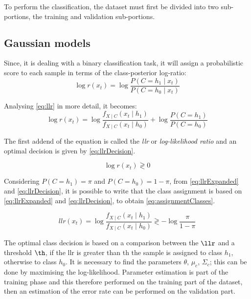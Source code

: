 
To perform the classification, the dataset must first be divided into two sub-portions, the training and validation sub-portions.

\subsection{Gaussian models}
\label{subsec:gaussianModels}
Since, it is dealing with a binary classification task, it will assign a probabilistic score to each sample in terms
of the class-posterior log-ratio:
\begin{equation}
    \log r(x_t) = \log \frac{P(C=h_1\mid x_t)}{P(C=h_0\mid x_t)}
    \label{eq:llr}
\end{equation}

Analysing \autoref{eq:llr} in more detail, it becomes:
\begin{equation}
    \log r(x_t) = \log \frac{f_{X\mid C}(x_t \mid h_1)}{f_{X\mid C}(x_t \mid h_0)} + \log \frac{P(C=h_1)}{P(C=h_0)}
    \label{eq:llrExpanded}
\end{equation}

The first addend of the equation is called the \textit{llr} or \textit{log-likelihood ratio} and an optimal decision is
given by \autoref{eq:llrDecision}.

\begin{equation}
    \log r(x_t) \gtrless 0
    \label{eq:llrDecision}
\end{equation}

Considering \(P(C=h_1) = \pi \) and \(P(C=h_0) = 1 - \pi\), from \autoref{eq:llrExpanded} and \autoref{eq:llrDecision},
it is possible to write that the class assignment is based on \autoref{eq:llrExpanded} and \autoref{eq:llrDecision},
to obtain \autoref{eq:assignmentClasses}.

\begin{equation}
    llr(x_t)=\log \frac{f_{X\mid C}(x_t \mid h_1)}{f_{X\mid C}(x_t \mid h_0)} \gtrless -\log \frac{\pi}{1 - \pi}
    \label{eq:assignmentClasses}
\end{equation}

The optimal class decision is based on a comparison between the \(\llr\) and a threshold \(\th\),
if the llr is greater than th the sample is assigned to class \(h_1\), otherwise to class \(h_0\).
It is necessary to find the parameters \(\theta\), \(\mu_c\), \(\Sigma_c\); this can be done by maximising the log-likelihood.
Parameter estimation is part of the training phase and this therefore performed on the training part of the dataset,
then an estimation of the error rate can be performed on the validation part.

